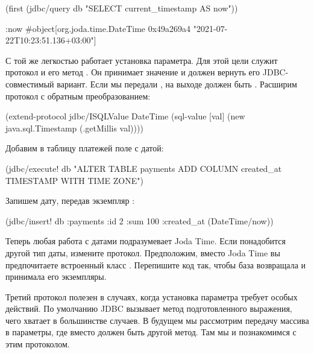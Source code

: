 \begin{english}
  \begin{clojure}
(first (jdbc/query db "SELECT current_timestamp AS now"))

{:now #object[org.joda.time.DateTime 0x49a269a4 "2021-07-22T10:23:51.136+03:00"]}
  \end{clojure}
\end{english}

С той же легкостью работает установка параметра. Для этой цели служит протокол  и его метод . Он принимает значение и должен вернуть его JDBC-совместимый вариант. Если мы передали , на выходе должен быть . Расширим протокол с обратным преобразованием:

\begin{english}
  \begin{clojure}
(extend-protocol jdbc/ISQLValue
  DateTime
  (sql-value [val]
    (new java.sql.Timestamp (.getMillis val))))
  \end{clojure}
\end{english}

Добавим в таблицу платежей поле с датой:

\begin{english}
  \begin{clojure}
(jdbc/execute! db "ALTER TABLE payments ADD COLUMN created_at TIMESTAMP WITH TIME ZONE")
  \end{clojure}
\end{english}

Запишем дату, передав экземпляр :

\begin{english}
  \begin{clojure}
(jdbc/insert! db :payments
              {:id 2 :sum 100 :created_at (DateTime/now)})
  \end{clojure}
\end{english}

Теперь любая работа с датами подразумевает Joda Time. Если понадобится другой тип даты, измените протокол. Предположим, вместо Joda Time вы предпочитаете встроенный класс . Перепишите код так, чтобы база возвращала и принимала его экземпляры.

Третий протокол  полезен в случаях, когда установка параметра требует особых действий. По умолчанию JDBC вызывает метод  подготовленного выражения, чего хватает в большинстве случаев. В будущем мы рассмотрим передачу массива в параметры, где вместо  должен быть другой метод. Там мы и познакомимся с этим протоколом.

